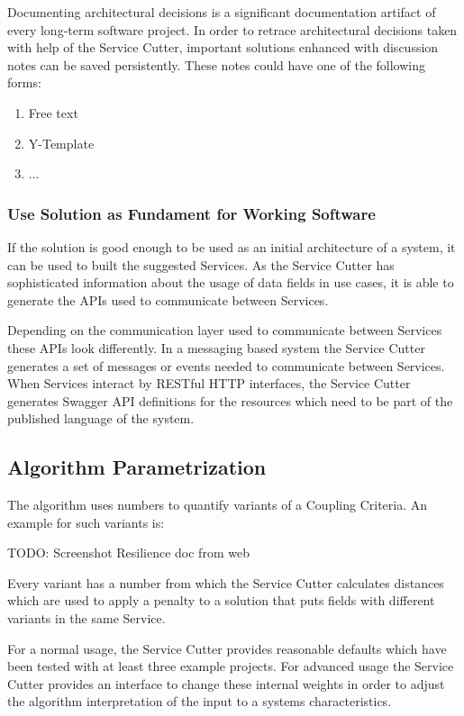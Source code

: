 Documenting architectural decisions is a significant documentation artifact of every long-term software project. In order to retrace architectural decisions taken with help of the Service Cutter, important solutions enhanced with discussion notes can be saved persistently. These notes could have one of the following forms:

\begin{enumerate}
	\item Free text
	\item Y-Template\cite{y-template}
	\item ...
\end{enumerate}

\subsubsection{Use Solution as Fundament for Working Software}

If the solution is good enough to be used as an initial architecture of a system, it can be used to built the suggested Services. As the Service Cutter has sophisticated information about the usage of data fields in use cases, it is able to generate the APIs used to communicate between Services. 

Depending on the communication layer used to communicate between Services these APIs look differently. In a messaging based system the Service Cutter generates a set of messages or events needed to communicate between Services. When Services interact by RESTful HTTP interfaces, the Service Cutter generates Swagger\cite{swagger} API definitions for the resources which need to be part of the published language\cite[p.375]{evans2003domain} of the system. 


\subsection{Algorithm Parametrization}

The algorithm uses numbers to quantify variants of a Coupling Criteria. An example for such variants is:

TODO: Screenshot Resilience doc from web

Every variant has a number from which the Service Cutter calculates distances which are used to apply a penalty to a solution that puts fields with different variants in the same Service. 

For a normal usage, the Service Cutter provides reasonable defaults which have been tested with at least three example projects. For advanced usage the Service Cutter provides an interface to change these internal weights in order to adjust the algorithm interpretation of the input to a systems characteristics. 


